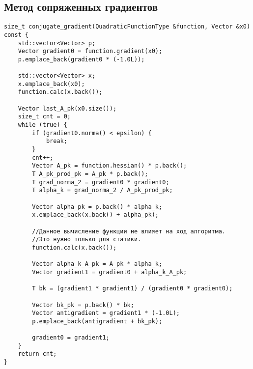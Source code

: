 \newpage
\subsection{Метод сопряженных градиентов}


\begin{lstlisting}
size_t conjugate_gradient(QuadraticFunctionType &function, Vector &x0) const {
    std::vector<Vector> p;
    Vector gradient0 = function.gradient(x0);
    p.emplace_back(gradient0 * (-1.0L));

    std::vector<Vector> x;
    x.emplace_back(x0);
    function.calc(x.back());

    Vector last_A_pk(x0.size());
    size_t cnt = 0;
    while (true) {
        if (gradient0.norma() < epsilon) {
            break;
        }
        cnt++;
        Vector A_pk = function.hessian() * p.back();
        T A_pk_prod_pk = A_pk * p.back();
        T grad_norma_2 = gradient0 * gradient0;
        T alpha_k = grad_norma_2 / A_pk_prod_pk;

        Vector alpha_pk = p.back() * alpha_k;
        x.emplace_back(x.back() + alpha_pk);

        //Данное вычисление функции не влияет на ход алгоритма.
        //Это нужно только для статики.
        function.calc(x.back());

        Vector alpha_k_A_pk = A_pk * alpha_k;
        Vector gradient1 = gradient0 + alpha_k_A_pk;

        T bk = (gradient1 * gradient1) / (gradient0 * gradient0);

        Vector bk_pk = p.back() * bk;
        Vector antigradient = gradient1 * (-1.0L);
        p.emplace_back(antigradient + bk_pk);

        gradient0 = gradient1;
    }
    return cnt;
}

\end{lstlisting}

